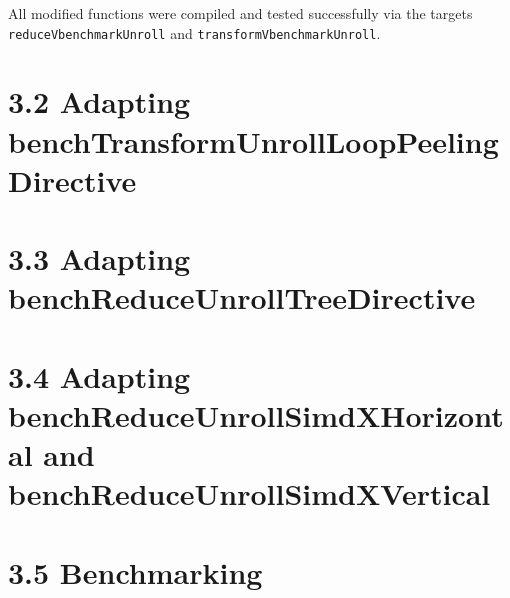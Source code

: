 All modified functions were compiled and tested successfully via the targets \\
\texttt{reduceVbenchmarkUnroll} and \texttt{transformVbenchmarkUnroll}.

\pagebreak

\pagebreak

\section*{3.2 Adapting benchTransformUnrollLoopPeelingDirective}

\pagebreak

\section*{3.3 Adapting benchReduceUnrollTreeDirective}

\pagebreak

\section*{3.4 Adapting benchReduceUnrollSimdXHorizontal and benchReduceUnrollSimdXVertical}

\pagebreak

\section*{3.5 Benchmarking}

